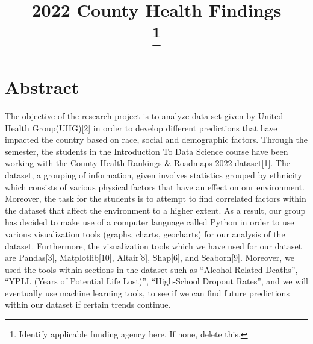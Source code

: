 \documentclass[conference]{IEEEtran}
\begin{document}
\title{2022 County Health Findings\\

\thanks{Identify applicable funding agency here. If none, delete this.}
}


\author{
\and
{}
\and
{}
\and
}


\maketitle
\thispagestyle{fancy}

\section{Abstract}
The objective of the research project is to
analyze data set given by United Health Group(UHG)[2] in order to develop different predictions that have impacted the country based on race, social and demographic factors.
Through the semester, the students in the Introduction To Data Science course have been working with the County Health Rankings \& Roadmaps 2022 dataset[1]. The dataset, a grouping of information, given involves statistics grouped by ethnicity which consists of various physical factors that have an effect on our environment. Moreover, the task for the students is to attempt to find correlated factors within the dataset that affect the environment to a higher extent. As a result, our group has decided to make use of a computer language called Python in order to use various visualization tools (graphs, charts, geocharts) for our analysis of the dataset. Furthermore, the visualization tools which we have used for our dataset are Pandas[3], Matplotlib[10], Altair[8], Shap[6], and Seaborn[9]. Moreover, we used the tools within sections in the dataset such as “Alcohol Related Deaths”, “YPLL (Years of Potential Life Lost)”, “High-School Dropout Rates”, and we will eventually use machine learning tools, to see if we can find future predictions within our dataset if certain trends continue.\\
\end{document}
